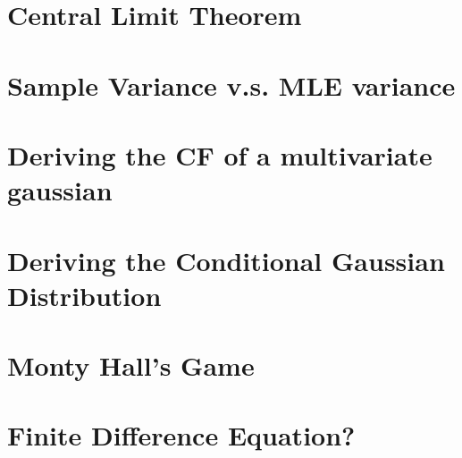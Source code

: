 \documentclass{article}
\begin{document}
\section{Central Limit Theorem}

\section{Sample Variance v.s. MLE variance}

\section{Deriving the CF of a multivariate gaussian}

\section{Deriving the Conditional Gaussian Distribution}

\section{Monty Hall's Game}

\section{Finite Difference Equation?}
\end{document}
